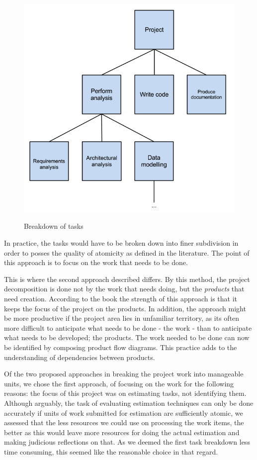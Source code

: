 \begin{figure}[H]
\centering
\includegraphics[scale=0.5]{TaskBreakdown.png}
\label{taskbreakdown}
\caption{Breakdown of tasks}
\end{figure}

In practice, the tasks would have to be broken down into finer subdivision in order to posses the quality of atomicity as defined in the literature. The point of this approach is to focus on the work that needs to be done.

This is where the second approach described differs. By this method, the project decomposition is done not by the work that needs doing, but the \textit{products}  that need creation. According to the book the strength of this approach is that it keeps the focus of the project on the products. In addition, the approach might be more productive if the project area lies in unfamiliar territory, as its often more difficult to anticipate what needs to be done - the work - than to anticipate what needs to be developed; the products. The work needed to be done can now be identified by composing product flow diagrams. This practice adds to the understanding of dependencies between products.

Of the two proposed approaches in breaking the project work into manageable units, we chose the first approach, of focusing on the work for the following reasons: the focus of this project was on estimating tasks, not identifying them. Although arguably, the task of evaluating estimation techniques can only be done accurately if units of work submitted for estimation are sufficiently atomic, we assessed that the less resources we could use on processing the work items, the better as this would leave more resources for doing the actual estimation and making judicious reflections on that. As we deemed the first task breakdown less time consuming, this seemed like the reasonable choice in that regard.

